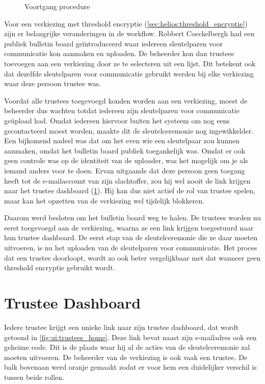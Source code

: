 \begin{figure}
  \caption{Voortgang procedure}
  \label{fig:ui:election_progress}
\end{figure}

\npar Voor een verkiezing met threshold encryptie (\ref{sec:helios:threshold_encryptie}) zijn er belangrijke veranderingen in de workflow. Robbert Coeckelbergh had een publiek bulletin board ge\"introduceerd waar iedereen sleutelparen voor communicatie kon aanmaken en uploaden. De beheerder kon dan trustees toevoegen aan een verkiezing door ze te selecteren uit een lijst. Dit betekent ook dat dezelfde sleutelparen voor communicatie gebruikt werden bij elke verkiezing waar deze persoon trustee was.

\npar Voordat alle trustees toegevoegd konden worden aan een verkiezing, moest de beheerder dus wachten totdat iedereen zijn sleutelparen voor communicatie ge\"upload had. Omdat iedereen hiervoor buiten het systeem om nog eens gecontacteerd moest worden, maakte dit de sleutelceremonie nog ingewikkelder. Een bijkomend nadeel was dat om het even wie een sleutelpaar zou kunnen aanmaken, omdat het bulletin board publiek toegankelijk was. Omdat er ook geen controle was op de identiteit van de uploader, was het mogelijk om je als iemand anders voor te doen. Ervan uitgaande dat deze persoon geen toegang heeft tot de e-mailaccount van zijn slachtoffer, zou hij wel nooit de link krijgen naar het trustee dashboard (\ref{sec:ui:trustee_dashboard}). Hij kan dus niet actief de rol van trustee spelen, maar kan het opzetten van de verkiezing wel tijdelijk blokkeren.

\npar Daarom werd besloten om het bulletin board weg te halen. De trustees worden nu eerst toegevoegd aan de verkiezing, waarna ze een link krijgen toegestuurd naar hun trustee dashboard. De eerst stap van de sleutelceremonie die ze daar moeten uitvoeren, is nu het uploaden van de sleutelparen voor communicatie. Het proces dat een trustee doorloopt, wordt zo ook beter vergelijkbaar met dat wanneer geen threshold encryptie gebruikt wordt.

\section{Trustee Dashboard}
\label{sec:ui:trustee_dashboard}

Iedere trustee krijgt een unieke link naar zijn trustee dashboard, dat wordt getoond in \ref{fig:ui:trustees_home}. Deze link bevat naast zijn e-mailadres ook een geheime code. Dit is de plaats waar hij al de acties van de sleutelceremonie zal moeten uitvoeren. De beheerder van de verkiezing is ook vaak een trustee. De balk bovenaan werd oranje gemaakt zodat er voor hem een duidelijker verschil is tussen beide rollen.

